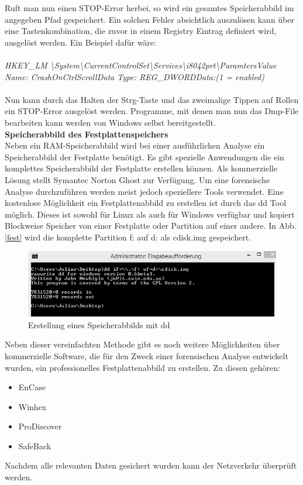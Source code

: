 \noindent Ruft man nun einen STOP-Error herbei, so wird ein gesamtes Speicherabbild im angegeben Pfad gespeichert. Ein solchen Fehler absichtlich auszulösen kann über eine Tastenkombination, die zuvor in einem Registry Eintrag definiert wird, ausgelöst werden. Ein Beispiel dafür wäre:\\\\
\noindent\emph{HKEY\_LM \textbackslash System\textbackslash CurrentControlSet\textbackslash Services\textbackslash i8042prt\textbackslash ParamtersValue \newline Name: CrashOnCtrlScrollData Type: REG\_DWORDData:(1 = enabled)}\\\\
\noindent Nun kann durch das Halten der Strg-Taste und das zweimalige Tippen auf Rollen ein STOP-Error ausgelöst werden. Programme, mit denen man nun das Dmp-File bearbeiten kann werden von Windows selbst bereitgestellt.\\

\noindent\textbf{Speicherabbild des Festplattenspeichers}\\
\noindent Neben ein RAM-Speicherabbild wird bei einer ausführlichen Analyse ein Speicherabbild der Festplatte benötigt. Es gibt spezielle Anwendungen die ein komplettes Speicherabbild der Festplatte erstellen können. Als kommerzielle Lösung stellt Symantec Norton Ghost zur Verfügung. Um eine forensische Analyse durchzuführen werden meist jedoch speziellere Tools verwendet. Eine kostenlose Möglichkeit ein Festplattenabbild zu erstellen ist durch das dd Tool möglich. Dieses ist sowohl für Linux als auch für Windows verfügbar und kopiert Blockweise Speicher von einer Festplatte oder Partition auf einer andere. In Abb. \ref{fest} wird die komplette Partition f: auf d: als cdisk.img gespeichert.\\

\begin{figure}[h]
    \centering\includegraphics[scale=0.7]{Bilder/DD.png}
  \caption{Erstellung eines Speicherabbilds mit dd}
  \label{dd}
\end{figure}

\noindent Neben dieser vereinfachten Methode gibt es noch weitere Möglichkeiten über kommerzielle Software, die für den Zweck einer forensischen Analyse entwickelt wurden, ein professionelles Festplattenabbild zu erstellen. Zu diesen gehören:
\begin{itemize}
\item EnCase
\item Winhex
\item ProDiscover
\item SafeBack
\end{itemize}

\noindent Nachdem alle relevanten Daten gesichert wurden kann der Netzverkehr überprüft werden.